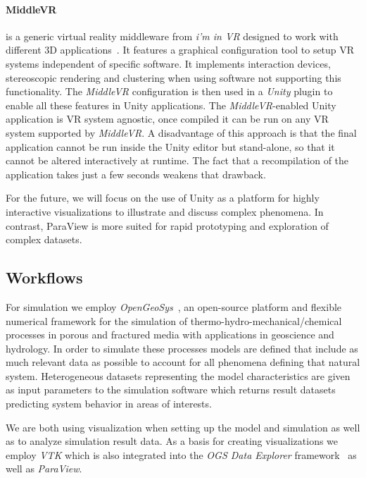 \documentclass[twocolumn]{svjour3}          %
\begin{document}
\paragraph{MiddleVR}
is a generic virtual reality middleware from \emph{i'm in VR} designed to work with different 3D applications~\cite{web:middlevr}. It features a graphical configuration tool to setup VR systems independent of specific software. It implements interaction devices, stereoscopic rendering and clustering when using software not supporting this functionality. The \emph{MiddleVR} configuration is then used in a \emph{Unity} plugin to enable all these features in Unity applications. The \emph{MiddleVR}-enabled Unity application is VR system agnostic, once compiled it can be run on any VR system supported by \emph{MiddleVR}. A disadvantage of this approach is that the final application cannot be run inside the Unity editor but stand-alone, so that it cannot be altered interactively at runtime. The fact that a recompilation of the application takes just a few seconds weakens that drawback.

For the future, we will focus on the use of Unity as a platform for highly interactive visualizations to illustrate and discuss complex phenomena. In contrast, ParaView is more suited for rapid prototyping and exploration of complex datasets.

\subsection{Workflows}
\label{workflows}

For simulation we employ \emph{OpenGeoSys}~\cite{kolditz:ogs}, an open-source platform and flexible numerical framework for the simulation of thermo-hydro-mechanical/chemical processes in porous and fractured media with applications in geoscience and hydrology. In order to simulate these processes models are defined that include as much relevant data as possible to account for all phenomena defining that natural system. Heterogeneous datasets representing the model characteristics are given as input parameters to the simulation software which returns result datasets predicting system behavior in areas of interests.

We are both using visualization when setting up the model and simulation as well as to analyze simulation result data. As a basis for creating visualizations we employ \emph{VTK} which is also integrated into the \emph{OGS Data Explorer} framework~\cite{rink:eesenvirvis} as well as \emph{ParaView}.
\end{document}
